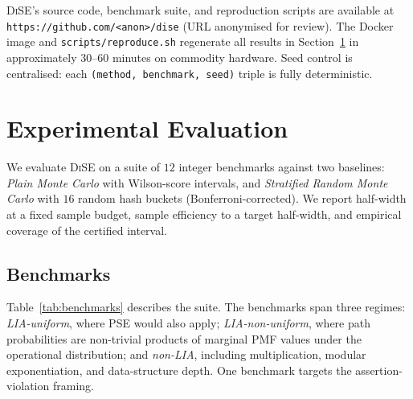 \documentclass[runningheads]{llncs}
\providecommand{\Cref}[1]{Section~\ref{#1}}
\newcommand{\toolname}{\textsc{DiSE}}
\newcommand{\code}[1]{\texttt{#1}}
\begin{document}
\toolname{}'s source code, benchmark suite, and reproduction scripts
are available at \code{https://github.com/<anon>/dise} (URL anonymised
for review).  The Docker image and \code{scripts/reproduce.sh}
regenerate all results in \Cref{sec:results} in approximately
$30$--$60$ minutes on commodity hardware.  Seed control is
centralised: each \code{(method, benchmark, seed)} triple is fully
deterministic.

\section{Experimental Evaluation}\label{sec:results}

We evaluate \toolname{} on a suite of $12$ integer benchmarks against
two baselines: \emph{Plain Monte Carlo} with Wilson-score intervals,
and \emph{Stratified Random Monte Carlo} with $16$ random hash buckets
(Bonferroni-corrected).  We report half-width at a fixed sample
budget, sample efficiency to a target half-width, and empirical
coverage of the certified interval.

\subsection{Benchmarks}\label{sec:benchmarks}

Table~\ref{tab:benchmarks} describes the suite.  The benchmarks span
three regimes: \emph{LIA-uniform}, where PSE would also apply;
\emph{LIA-non-uniform}, where path probabilities are non-trivial
products of marginal PMF values under the operational distribution;
and \emph{non-LIA}, including multiplication, modular exponentiation,
and data-structure depth.  One benchmark targets the
assertion-violation framing.
\end{document}
